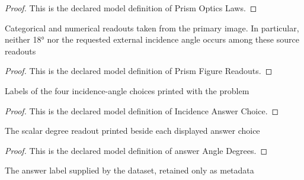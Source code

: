 \begin{proof}
  This is the declared model definition of Prism Optics Laws.
\end{proof}
\begin{definition}
  \label{def:physics:phyx-mini-0016:phyxminiproblems-problemphyxmini0016-prismfigurereadouts}
  Categorical and numerical readouts taken from the primary image. In particular, neither 18° nor the requested external incidence angle occurs among these source readouts
\end{definition}
\begin{proof}
  This is the declared model definition of Prism Figure Readouts.
\end{proof}
\begin{definition}
  \label{def:physics:phyx-mini-0016:phyxminiproblems-problemphyxmini0016-incidenceanswerchoice}
  Labels of the four incidence-angle choices printed with the problem
\end{definition}
\begin{proof}
  This is the declared model definition of Incidence Answer Choice.
\end{proof}
\begin{definition}
  \label{def:physics:phyx-mini-0016:phyxminiproblems-problemphyxmini0016-answerangledegrees}
  The scalar degree readout printed beside each displayed answer choice
\end{definition}
\begin{proof}
  This is the declared model definition of answer Angle Degrees.
\end{proof}
\begin{definition}
  \label{def:physics:phyx-mini-0016:phyxminiproblems-problemphyxmini0016-recordeddatasetanswerchoice}
  The answer label supplied by the dataset, retained only as metadata
\end{definition}
